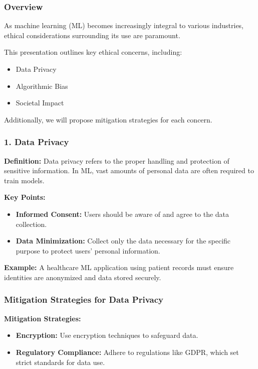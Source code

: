 \documentclass[aspectratio=169]{beamer}
\begin{document}
\begin{frame}[fragile]
    \frametitle{Overview}
    As machine learning (ML) becomes increasingly integral to various industries, ethical considerations surrounding its use are paramount.
    
    This presentation outlines key ethical concerns, including:
    \begin{itemize}
        \item Data Privacy
        \item Algorithmic Bias
        \item Societal Impact
    \end{itemize}
    
    Additionally, we will propose mitigation strategies for each concern.
\end{frame}

\begin{frame}[fragile]
    \frametitle{1. Data Privacy}
    \textbf{Definition:} Data privacy refers to the proper handling and protection of sensitive information. In ML, vast amounts of personal data are often required to train models.
    
    \textbf{Key Points:}
    \begin{itemize}
        \item \textbf{Informed Consent:} Users should be aware of and agree to the data collection.
        \item \textbf{Data Minimization:} Collect only the data necessary for the specific purpose to protect users' personal information.
    \end{itemize}
    
    \textbf{Example:} A healthcare ML application using patient records must ensure identities are anonymized and data stored securely.
\end{frame}

\begin{frame}[fragile]
    \frametitle{Mitigation Strategies for Data Privacy}
    \textbf{Mitigation Strategies:}
    \begin{itemize}
        \item \textbf{Encryption:} Use encryption techniques to safeguard data.
        \item \textbf{Regulatory Compliance:} Adhere to regulations like GDPR, which set strict standards for data use.
    \end{itemize}
\end{frame}
\end{document}
